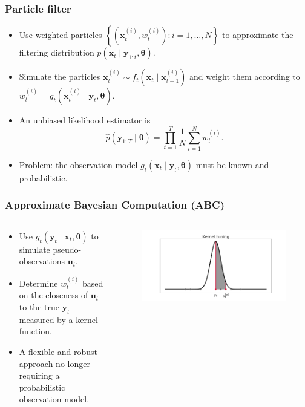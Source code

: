 \documentclass{beamer}
\newcommand{\bx}{\bm{x}}
\newcommand{\by}{\bm{y}}
\newcommand{\bu}{\bm{u}}
\newcommand{\btheta}{\bm{\theta}}
\newcommand{\trans}{f}
\newcommand{\obs}{g}
\begin{document}
    \begin{frame}
    \frametitle{Particle filter}
    \begin{itemize}
        \item Use weighted particles $\left\{\left(\bx_t^{(i)}, w_t^{(i)}\right) : i = 1, \ldots, N\right\}$ to approximate the filtering distribution $p(\bx_t \mid \by_{1:t}, \btheta)$.
        \item Simulate the particles $\bx_t^{(i)} \sim \trans_t(\bx_t \mid \bx_{t-1}^{(i)})$ and weight them according to $w_t^{(i)} = \obs_t(\bx_t^{(i)} \mid \by_t, \btheta)$.
        \item An unbiased likelihood estimator is
        \begin{equation*}
        \widehat{p}(\by_{1:T} \mid \btheta) = \prod_{t=1}^T \frac{1}{N} \sum_{i=1}^N w_t^{(i)}.
        \end{equation*}
        \item Problem: the observation model $\obs_t(\bx_t \mid \by_t, \btheta)$ must be known and probabilistic.
    \end{itemize}
    \end{frame}

    \begin{frame}
    \frametitle{Approximate Bayesian Computation (ABC)}
    \begin{columns}
        \begin{column}{0.45\textwidth}
            \begin{itemize}
                \item Use $\obs_t(\by_t \mid \bx_t, \btheta)$ to simulate pseudo-observations $\bu_t$.
                \item Determine $w_t^{(i)}$ based on the closeness of $\bu_t$ to the true $\by_t$ measured by a kernel function.
                \item A flexible and robust approach no longer requiring a probabilistic observation model.
            \end{itemize}
        \end{column}
%
        \begin{column}{0.5\textwidth}
            \begin{figure}
                \centering
                \includegraphics[width=\columnwidth]{images/kernel}
            \end{figure}
        \end{column}
    \end{columns}
    \end{frame}
\end{document}
